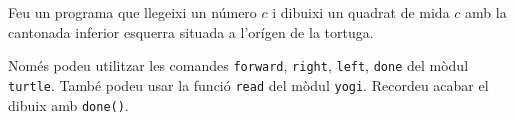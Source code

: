 

\Statement

Feu un programa que llegeixi un número $c$
i dibuixi un quadrat de mida $c$ amb la cantonada inferior esquerra
situada a l'orígen de la tortuga.

\medskip

Només podeu utilitzar les comandes 
\texttt{forward},
\texttt{right},
\texttt{left},
\texttt{done} del mòdul \texttt{turtle}.
També podeu usar la funció \texttt{read} del mòdul \texttt{yogi}.
Recordeu acabar el dibuix amb \texttt{done()}.


\Sample

